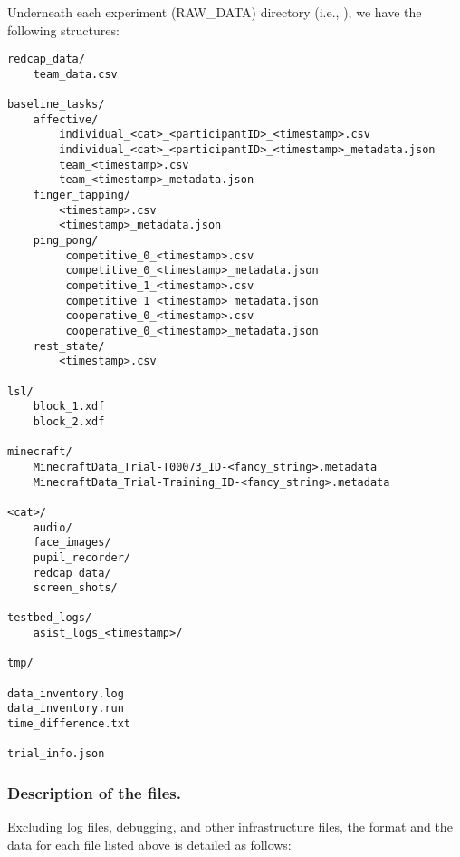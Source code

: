 Underneath each experiment (RAW\_DATA) directory (i.e.,
), we have the following structures:
\begin{verbatim}
redcap_data/
    team_data.csv

baseline_tasks/
    affective/
        individual_<cat>_<participantID>_<timestamp>.csv
        individual_<cat>_<participantID>_<timestamp>_metadata.json
        team_<timestamp>.csv
        team_<timestamp>_metadata.json
    finger_tapping/
        <timestamp>.csv
        <timestamp>_metadata.json
    ping_pong/
         competitive_0_<timestamp>.csv
         competitive_0_<timestamp>_metadata.json
         competitive_1_<timestamp>.csv
         competitive_1_<timestamp>_metadata.json
         cooperative_0_<timestamp>.csv
         cooperative_0_<timestamp>_metadata.json
    rest_state/
        <timestamp>.csv

lsl/
    block_1.xdf
    block_2.xdf

minecraft/
    MinecraftData_Trial-T00073_ID-<fancy_string>.metadata
    MinecraftData_Trial-Training_ID-<fancy_string>.metadata

<cat>/
    audio/
    face_images/
    pupil_recorder/
    redcap_data/
    screen_shots/

testbed_logs/
    asist_logs_<timestamp>/

tmp/

data_inventory.log
data_inventory.run
time_difference.txt

trial_info.json
\end{verbatim}

\subsubsection{Description of the files.}

\noindent
Excluding log files, debugging, and other infrastructure files, the format and
the data for each file listed
above is detailed as follows: \\



